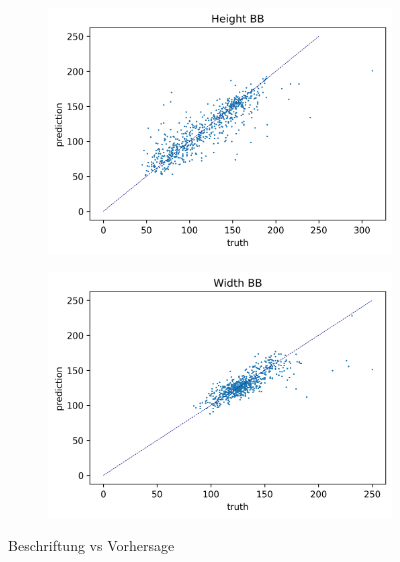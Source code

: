  	 	\begin{figure}[h]
 		\centering
 		\begin{subfigure}[c]{0.49\textwidth}			
 			\includegraphics[width=1\textwidth]{bilder/FazitUndAusblick/Grapple_TTAE_Res/Height_BB.png}
 		\end{subfigure}
 		\begin{subfigure}[c]{0.49\textwidth}			
 			\includegraphics[width=1\textwidth]{bilder/FazitUndAusblick/Grapple_TTAE_Res/Width_BB.png}
 		\end{subfigure}  
 		\caption{Beschriftung vs Vorhersage}
 		\label{img:TTGrappleLabelVsPred}
 	\end{figure}
 
